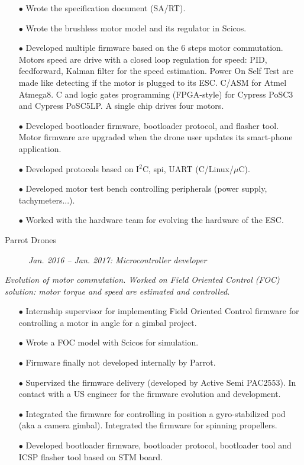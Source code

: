 \documentclass{crcv}
\newcommand{\desc}[4]{
\begin{description}
\item[\textcolor{fortitle}{#1}]\hspace*{\fill}\textit{\textcolor{fortitle}{#2 -- #3: #4}}\\
\end{description}
}
\begin{document}
\begin{itemize}
\item[$\bullet$] Wrote the specification document (SA/RT).
\item[$\bullet$] Wrote the brushless motor model and its regulator
  in Scicos.
\item[$\bullet$] Developed multiple firmware based on the 6 steps
  motor commutation. Motors speed are drive with a closed loop
  regulation for speed: PID, feedforward, Kalman filter for the speed
  estimation. Power On Self Test are made like detecting if the motor
  is plugged to its ESC. C/ASM for Atmel Atmega8. C and logic gates
  programming (FPGA-style) for Cypress PoSC3 and Cypress PoSC5LP. A
  single chip drives four motors.
\item[$\bullet$] Developed bootloader firmware, bootloader protocol,
  and flasher tool. Motor firmware are upgraded when the drone user
  updates its smart-phone application.
\item[$\bullet$] Developed protocols based on I$^2$C, spi, UART
  (C/Linux/$\mu$C).
\item[$\bullet$] Developed motor test bench controlling peripherals
  (power supply, tachymeters...).
\item[$\bullet$] Worked with the hardware team for evolving the
  hardware of the ESC.
\end{itemize}

\desc{Parrot Drones}{Jan. 2016}{Jan. 2017}{Microcontroller developer}

\textit{Evolution of motor commutation. Worked on Field Oriented
  Control (FOC) solution: motor torque and speed are estimated and
  controlled.}

\begin{itemize}
\item[$\bullet$] Internship supervisor for implementing Field Oriented
  Control firmware for controlling a motor in angle for a gimbal
  project.
\item[$\bullet$] Wrote a FOC model with Scicos for simulation.
\item[$\bullet$] Firmware finally not developed internally by Parrot.
\item[$\bullet$] Supervized the firmware delivery (developed by Active
  Semi PAC2553). In contact with a US engineer for the firmware
  evolution and development.
\item[$\bullet$] Integrated the firmware for controlling in position a
  gyro-stabilized pod (aka a camera gimbal). Integrated the firmware
  for spinning propellers.
\item[$\bullet$] Developed bootloader firmware, bootloader protocol,
  bootloader tool and ICSP flasher tool based on STM board.
\end{itemize}
\end{document}
